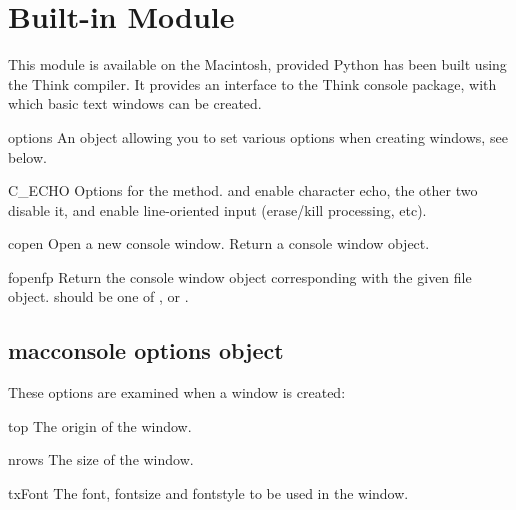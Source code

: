 \section{Built-in Module }
\label{module-macconsole}


This module is available on the Macintosh, provided Python has been
built using the Think \C{} compiler. It provides an interface to the
Think console package, with which basic text windows can be created.

\begin{datadesc}{options}
An object allowing you to set various options when creating windows,
see below.
\end{datadesc}

\begin{datadesc}{C_ECHO}
Options for the  method.  and
 enable character echo, the other two disable it,
 and  enable line-oriented input
(erase/kill processing, etc).
\end{datadesc}

\begin{funcdesc}{copen}{}
Open a new console window. Return a console window object.
\end{funcdesc}

\begin{funcdesc}{fopen}{fp}
Return the console window object corresponding with the given file
object.  should be one of ,  or
.
\end{funcdesc}

\subsection{macconsole options object}
These options are examined when a window is created:

\begin{datadesc}{top}
The origin of the window.
\end{datadesc}

\begin{datadesc}{nrows}
The size of the window.
\end{datadesc}

\begin{datadesc}{txFont}
The font, fontsize and fontstyle to be used in the window.
\end{datadesc}


